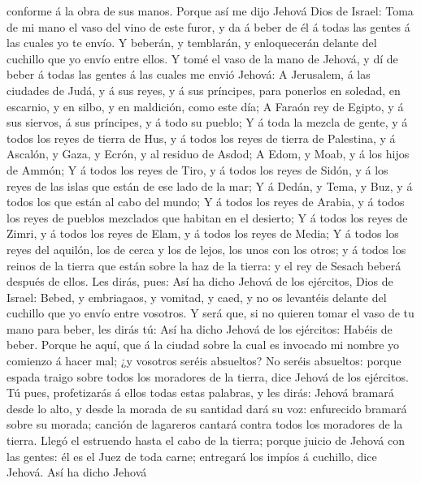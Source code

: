 conforme á la obra de sus manos.  Porque así me dijo
Jehová Dios de Israel: Toma de mi mano el vaso del vino de este furor, y
da á beber de él á todas las gentes á las cuales yo te envío.
 Y beberán, y temblarán, y enloquecerán delante del
cuchillo que yo envío entre ellos.  Y tomé el vaso de la
mano de Jehová, y dí de beber á todas las gentes á las cuales me envió
Jehová:  A Jerusalem, á las ciudades de Judá, y á sus
reyes, y á sus príncipes, para ponerlos en soledad, en escarnio, y en
silbo, y en maldición, como este día;  A Faraón rey de
Egipto, y á sus siervos, á sus príncipes, y á todo su pueblo;
 Y á toda la mezcla de gente, y á todos los reyes de
tierra de Hus, y á todos los reyes de tierra de Palestina, y á Ascalón,
y Gaza, y Ecrón, y al residuo de Asdod;  A Edom, y Moab,
y á los hijos de Ammón;  Y á todos los reyes de Tiro, y á
todos los reyes de Sidón, y á los reyes de las islas que están de ese
lado de la mar;  Y á Dedán, y Tema, y Buz, y á todos los
que están al cabo del mundo;  Y á todos los reyes de
Arabia, y á todos los reyes de pueblos mezclados que habitan en el
desierto;  Y á todos los reyes de Zimri, y á todos los
reyes de Elam, y á todos los reyes de Media;  Y á todos
los reyes del aquilón, los de cerca y los de lejos, los unos con los
otros; y á todos los reinos de la tierra que están sobre la haz de la
tierra: y el rey de Sesach beberá después de ellos.  Les
dirás, pues: Así ha dicho Jehová de los ejércitos, Dios de Israel:
Bebed, y embriagaos, y vomitad, y caed, y no os levantéis delante del
cuchillo que yo envío entre vosotros.  Y será que, si no
quieren tomar el vaso de tu mano para beber, les dirás tú: Así ha dicho
Jehová de los ejércitos: Habéis de beber.  Porque he
aquí, que á la ciudad sobre la cual es invocado mi nombre yo comienzo á
hacer mal; ¿y vosotros seréis absueltos? No seréis absueltos: porque
espada traigo sobre todos los moradores de la tierra, dice Jehová de los
ejércitos.  Tú pues, profetizarás á ellos todas estas
palabras, y les dirás: Jehová bramará desde lo alto, y desde la morada
de su santidad dará su voz: enfurecido bramará sobre su morada; canción
de lagareros cantará contra todos los moradores de la tierra.
 Llegó el estruendo hasta el cabo de la tierra; porque
juicio de Jehová con las gentes: él es el Juez de toda carne; entregará
los impíos á cuchillo, dice Jehová.  Así ha dicho Jehová
